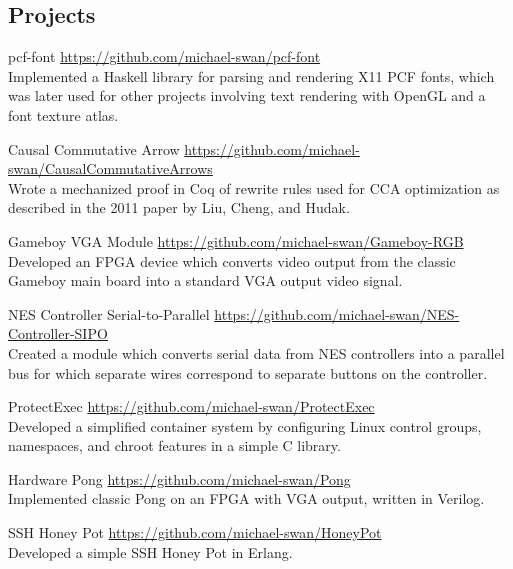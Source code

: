 \documentclass[letterpaper,margin,line,11pt]{resume}
\newcommand{\rurl}[1]{\hfill {\footnotesize \url{#1}}}
\begin{document}
\begin{resume}
\section{\mysidestyle Projects}
    \begin{compactdesc}
        \item[pcf-font] \rurl{https://github.com/michael-swan/pcf-font} \\
            Implemented a Haskell library for parsing and rendering X11 PCF fonts, which was later used for other
            projects involving text rendering with OpenGL and a font texture atlas.
        \item[Causal Commutative Arrow] \rurl{https://github.com/michael-swan/CausalCommutativeArrows} \\
            Wrote a mechanized proof in Coq of rewrite rules used for CCA optimization as described in the 2011 paper by
            Liu, Cheng, and Hudak.
        \item[Gameboy VGA Module] \rurl{https://github.com/michael-swan/Gameboy-RGB} \\
            Developed an FPGA device which converts video output from the classic Gameboy main board into a standard VGA
            output video signal.
        \item[NES Controller Serial-to-Parallel] \rurl{https://github.com/michael-swan/NES-Controller-SIPO} \\
            Created a module which converts serial data from NES controllers into a parallel bus for which separate
            wires correspond to separate buttons on the controller.
        \item[ProtectExec] \rurl{https://github.com/michael-swan/ProtectExec} \\
            Developed a simplified container system by configuring Linux control groups, namespaces, and chroot
            features in a simple C library.
        \item[Hardware Pong] \rurl{https://github.com/michael-swan/Pong} \\
            Implemented classic Pong on an FPGA with VGA output, written in Verilog.
        \item[SSH Honey Pot] \rurl{https://github.com/michael-swan/HoneyPot} \\
            Developed a simple SSH Honey Pot in Erlang.
    \end{compactdesc}

\end{resume}
\end{document}
